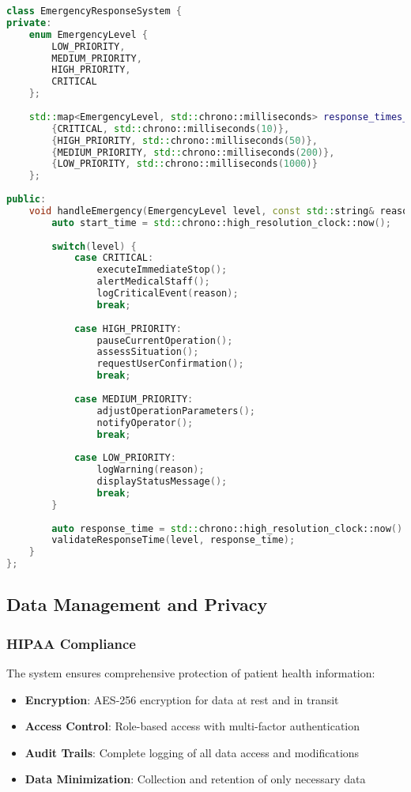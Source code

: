 \begin{lstlisting}[language=C++, caption={Emergency Response System}, label={lst:emergency-response}]
class EmergencyResponseSystem {
private:
    enum EmergencyLevel {
        LOW_PRIORITY,
        MEDIUM_PRIORITY,
        HIGH_PRIORITY,
        CRITICAL
    };
    
    std::map<EmergencyLevel, std::chrono::milliseconds> response_times_ = {
        {CRITICAL, std::chrono::milliseconds(10)},
        {HIGH_PRIORITY, std::chrono::milliseconds(50)},
        {MEDIUM_PRIORITY, std::chrono::milliseconds(200)},
        {LOW_PRIORITY, std::chrono::milliseconds(1000)}
    };
    
public:
    void handleEmergency(EmergencyLevel level, const std::string& reason) {
        auto start_time = std::chrono::high_resolution_clock::now();
        
        switch(level) {
            case CRITICAL:
                executeImmediateStop();
                alertMedicalStaff();
                logCriticalEvent(reason);
                break;
                
            case HIGH_PRIORITY:
                pauseCurrentOperation();
                assessSituation();
                requestUserConfirmation();
                break;
                
            case MEDIUM_PRIORITY:
                adjustOperationParameters();
                notifyOperator();
                break;
                
            case LOW_PRIORITY:
                logWarning(reason);
                displayStatusMessage();
                break;
        }
        
        auto response_time = std::chrono::high_resolution_clock::now() - start_time;
        validateResponseTime(level, response_time);
    }
};
\end{lstlisting}

\subsection{Data Management and Privacy}

\subsubsection{HIPAA Compliance}
The system ensures comprehensive protection of patient health information:

\begin{itemize}
    \item \textbf{Encryption}: AES-256 encryption for data at rest and in transit
    \item \textbf{Access Control}: Role-based access with multi-factor authentication
    \item \textbf{Audit Trails}: Complete logging of all data access and modifications
    \item \textbf{Data Minimization}: Collection and retention of only necessary data
\end{itemize}

